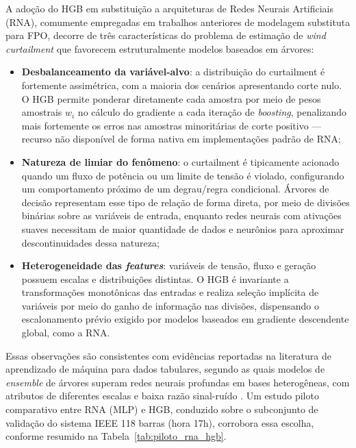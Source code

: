 \documentclass[conference]{IEEEtran}
\begin{document}
A adoção do HGB em substituição a arquiteturas de Redes Neurais
Artificiais (RNA), comumente empregadas em trabalhos anteriores de
modelagem substituta para FPO, decorre de três características do
problema de estimação de \textit{wind curtailment} que favorecem
estruturalmente modelos baseados em árvores:

\begin{itemize}
    \item \textbf{Desbalanceamento da variável-alvo}: a distribuição do
    curtailment é fortemente assimétrica, com a maioria dos cenários
    apresentando corte nulo. O HGB permite ponderar diretamente cada
    amostra por meio de pesos amostrais $w_i$ no cálculo do gradiente a
    cada iteração de \textit{boosting}, penalizando mais fortemente os
    erros nas amostras minoritárias de corte positivo — recurso não
    disponível de forma nativa em implementações padrão de RNA;

    \item \textbf{Natureza de limiar do fenômeno}: o curtailment é
    tipicamente acionado quando um fluxo de potência ou um limite de
    tensão é violado, configurando um comportamento próximo de um
    degrau/regra condicional. Árvores de decisão representam esse tipo
    de relação de forma direta, por meio de divisões binárias sobre as
    variáveis de entrada, enquanto redes neurais com ativações suaves
    necessitam de maior quantidade de dados e neurônios para aproximar
    descontinuidades dessa natureza;

    \item \textbf{Heterogeneidade das \textit{features}}: variáveis de
    tensão, fluxo e geração possuem escalas e distribuições distintas.
    O HGB é invariante a transformações monotônicas das entradas e
    realiza seleção implícita de variáveis por meio do ganho de
    informação nas divisões, dispensando o escalonamento prévio exigido
    por modelos baseados em gradiente descendente global, como a RNA.
\end{itemize}

Essas observações são consistentes com evidências reportadas na
literatura de aprendizado de máquina para dados tabulares, segundo as
quais modelos de \textit{ensemble} de árvores superam redes neurais
profundas em bases heterogêneas, com atributos de diferentes escalas e
baixa razão sinal-ruído \cite{grinsztajn2022tree}. Um estudo piloto
comparativo entre RNA (MLP) e HGB, conduzido sobre o subconjunto de
validação do sistema IEEE 118 barras (hora 17h), corrobora essa escolha,
conforme resumido na Tabela~\ref{tab:piloto_rna_hgb}.
\end{document}
